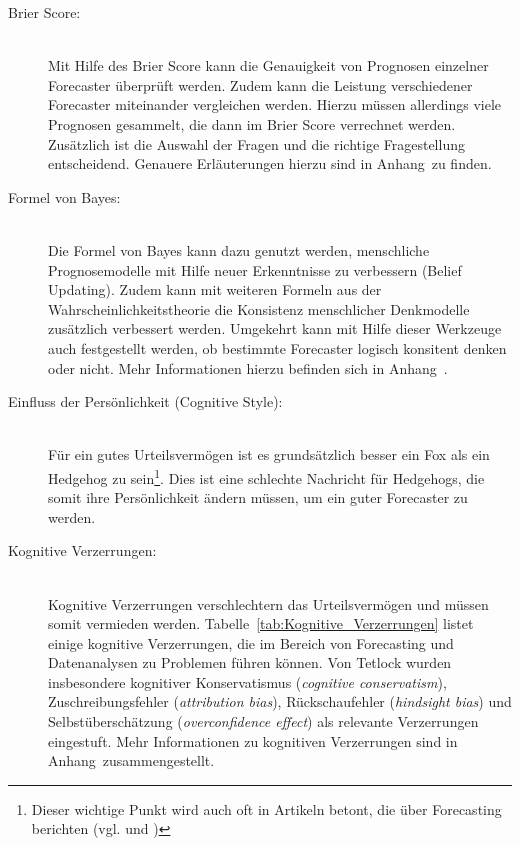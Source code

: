 \begin{description}

\item[Brier Score:] \hfill \\
Mit Hilfe des Brier Score kann die Genauigkeit von Prognosen einzelner Forecaster überprüft werden.
Zudem kann die Leistung verschiedener Forecaster miteinander vergleichen werden. Hierzu müssen allerdings
viele Prognosen gesammelt, die dann im Brier Score verrechnet werden. Zusätzlich ist die Auswahl der
Fragen und die richtige Fragestellung entscheidend. Genauere Erläuterungen hierzu sind in
Anhang~\xcom zu finden.

\item[Formel von Bayes:] \hfill \\
Die Formel von Bayes kann dazu genutzt werden, menschliche Prognosemodelle mit Hilfe neuer
Erkenntnisse zu verbessern (Belief Updating). Zudem kann mit weiteren Formeln aus der
Wahrscheinlichkeitstheorie die Konsistenz menschlicher Denkmodelle zusätzlich verbessert werden.
Umgekehrt kann mit Hilfe dieser Werkzeuge auch festgestellt werden, ob bestimmte Forecaster
logisch konsitent denken oder nicht. Mehr Informationen hierzu befinden sich in Anhang~\xcom. 

\item[Einfluss der Persönlichkeit (Cognitive Style):] \hfill \\
Für ein gutes Urteilsvermögen ist es grundsätzlich besser ein Fox als ein Hedgehog zu sein\footnote{
Dieser wichtige Punkt wird auch oft in Artikeln betont, die über Forecasting berichten (vgl.
\cite{Economist} und \cite{Burton})
}. Dies ist eine schlechte Nachricht für Hedgehogs, die somit ihre Persönlichkeit ändern müssen,
um ein guter Forecaster zu werden.

\item[Kognitive Verzerrungen:] \hfill \\
Kognitive Verzerrungen verschlechtern das Urteilsvermögen und müssen somit vermieden werden.
Tabelle~\ref{tab:Kognitive_Verzerrungen} listet einige kognitive Verzerrungen, die im Bereich
von Forecasting und Datenanalysen zu Problemen führen können. Von Tetlock wurden insbesondere
kognitiver Konservatismus (\emph{cognitive conservatism}), Zuschreibungsfehler (\emph{attribution bias}), 
Rückschaufehler (\emph{hindsight bias}) und Selbstüberschätzung (\emph{overconfidence effect}) als
relevante Verzerrungen eingestuft. Mehr Informationen zu kognitiven
Verzerrungen sind in Anhang~\xcom zusammengestellt.


\end{description}
